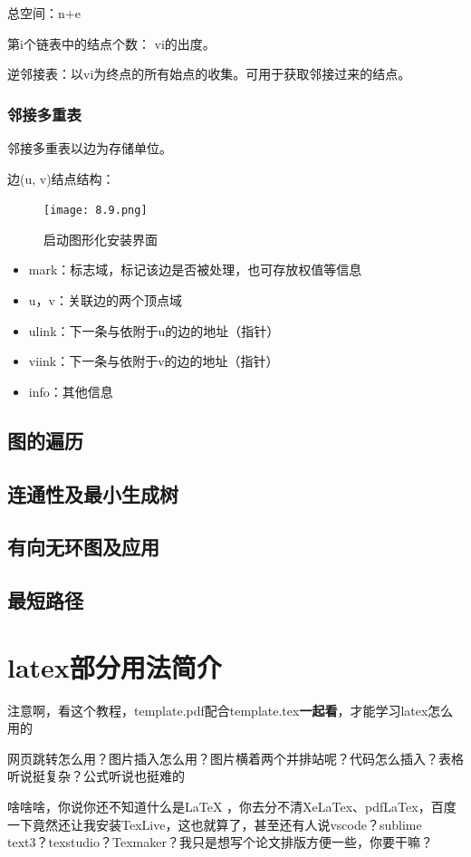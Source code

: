 \documentclass[AutoFakeBold]{LZUThesis2007}
\begin{document}
总空间：n+e

第i个链表中的结点个数： vi的出度。

逆邻接表：以vi为终点的所有始点的收集。可用于获取邻接过来的结点。
		\subsection{邻接多重表}
邻接多重表以边为存储单位。

边(u, v)结点结构：
\begin{figure}[H]
    \centering
    \texttt{[image: 8.9.png]}
    \caption{启动图形化安装界面}
    \label{fig_install_texlive}
\end{figure}
\begin{itemize}
	\item mark：标志域，标记该边是否被处理，也可存放权值等信息
	\item u，v：关联边的两个顶点域
	\item ulink：下一条与依附于u的边的地址（指针）
	\item viink：下一条与依附于v的边的地址（指针）
	\item info：其他信息
\end{itemize}


	\section{图的遍历}
	\section{连通性及最小生成树}
	\section{有向无环图及应用}
	\section{最短路径}



\chapter{latex部分用法简介}

注意啊，看这个教程，template.pdf配合template.tex\textbf{一起看}，才能学习latex怎么用的

网页跳转怎么用？图片插入怎么用？图片横着两个并排站呢？代码怎么插入？表格听说挺复杂？公式听说也挺难的

啥啥啥，你说你还不知道什么是LaTeX ，你去分不清XeLaTex、pdfLaTex，百度一下竟然还让我安装TexLive，这也就算了，甚至还有人说vscode？sublime text3？texstudio？Texmaker？我只是想写个论文排版方便一些，你要干嘛？
\end{document}
